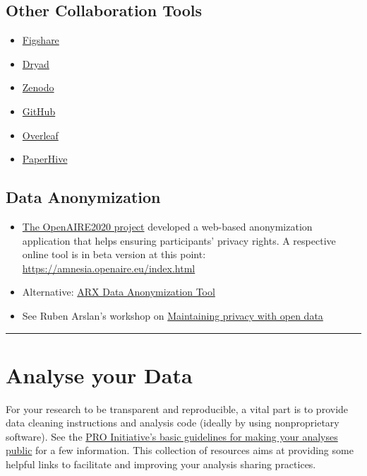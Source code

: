 \documentclass[12pt,]{report}
\providecommand{\tightlist}{%
  \setlength{\itemsep}{0pt}\setlength{\parskip}{0pt}}
\begin{document}
\subsection{Other Collaboration Tools}\label{other-collaboration-tools}

\begin{itemize}
\tightlist
\item
  \href{https://figshare.com/}{Figshare}
\item
  \href{https://datadryad.org/}{Dryad}
\item
  \href{https://zenodo.org/}{Zenodo}
\item
  \href{https://www.github.com}{GitHub}
\item
  \href{https://www.overleaf.com/}{Overleaf}
\item
  \href{https://paperhive.org/}{PaperHive}
\end{itemize}

\subsection{Data Anonymization}\label{data-anonymization}

\begin{itemize}
\tightlist
\item
  \href{https://www.openaire.eu/}{The OpenAIRE2020 project} developed a
  web-based anonymization application that helps ensuring participants'
  privacy rights. A respective online tool is in beta version at this
  point: \url{https://amnesia.openaire.eu/index.html}
\item
  Alternative: \href{http://arx.deidentifier.org/}{ARX Data
  Anonymization Tool}
\item
  See Ruben Arslan's workshop on
  \href{https://osf.io/9j27d/}{Maintaining privacy with open data}
\end{itemize}

\begin{center}\rule{0.5\linewidth}{\linethickness}\end{center}

\hypertarget{analyse}{\section{Analyse your Data}\label{analyse}}

For your research to be transparent and reproducible, a vital part is to
provide data cleaning instructions and analysis code (ideally by using
nonproprietary software). See the
\href{https://opennessinitiative.org/making-your-analyses-public/}{PRO
Initiative's basic guidelines for making your analyses
publi}\href{https://opennessinitiative.org/making-your-analyses-public/}{c}
for a few information. This collection of resources aims at providing
some helpful links to facilitate and improving your analysis sharing
practices.
\end{document}

